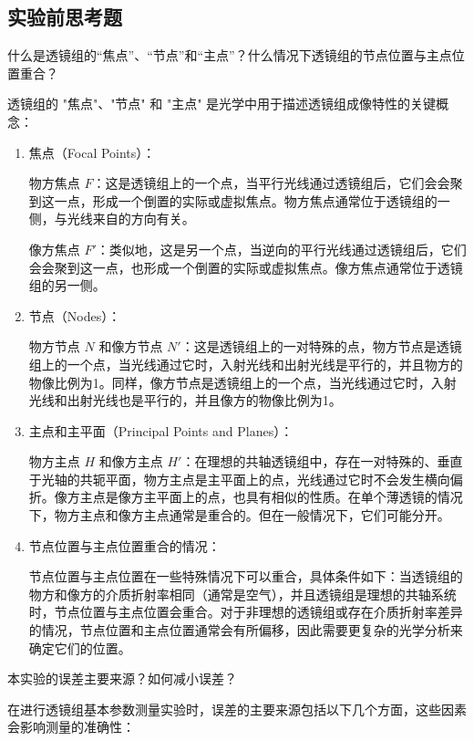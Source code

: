 \documentclass[dvipsnames, svgnames,a4paper,11pt]{article}
\begin{document}
	\subsection{实验前思考题}
	\begin{question}
		什么是透镜组的“焦点”、“节点”和“主点”？什么情况下透镜组的节点位置与主点位置重合？
	\end{question}
	透镜组的 "焦点"、"节点" 和 "主点" 是光学中用于描述透镜组成像特性的关键概念：
	\begin{enumerate}
		\item 焦点（Focal Points）：
		
		物方焦点 \(F\)：这是透镜组上的一个点，当平行光线通过透镜组后，它们会会聚到这一点，形成一个倒置的实际或虚拟焦点。物方焦点通常位于透镜组的一侧，与光线来自的方向有关。
		
		像方焦点 \(F'\)：类似地，这是另一个点，当逆向的平行光线通过透镜组后，它们会会聚到这一点，也形成一个倒置的实际或虚拟焦点。像方焦点通常位于透镜组的另一侧。
		
		\item 节点（Nodes）：
		
		物方节点 \(N\) 和像方节点 \(N'\)：这是透镜组上的一对特殊的点，物方节点是透镜组上的一个点，当光线通过它时，入射光线和出射光线是平行的，并且物方的物像比例为1。同样，像方节点是透镜组上的一个点，当光线通过它时，入射光线和出射光线也是平行的，并且像方的物像比例为1。
		
		\item 主点和主平面（Principal Points and Planes）：
		
		物方主点 \(H\) 和像方主点 \(H'\)：在理想的共轴透镜组中，存在一对特殊的、垂直于光轴的共轭平面，物方主点是主平面上的点，光线通过它时不会发生横向偏折。像方主点是像方主平面上的点，也具有相似的性质。在单个薄透镜的情况下，物方主点和像方主点通常是重合的。但在一般情况下，它们可能分开。
		
		\item 节点位置与主点位置重合的情况：
		
		节点位置与主点位置在一些特殊情况下可以重合，具体条件如下：当透镜组的物方和像方的介质折射率相同（通常是空气），并且透镜组是理想的共轴系统时，节点位置与主点位置会重合。对于非理想的透镜组或存在介质折射率差异的情况，节点位置和主点位置通常会有所偏移，因此需要更复杂的光学分析来确定它们的位置。
	\end{enumerate}
	
	\begin{question}
		本实验的误差主要来源？如何减小误差？
	\end{question}
	在进行透镜组基本参数测量实验时，误差的主要来源包括以下几个方面，这些因素会影响测量的准确性：
	
\end{document}
